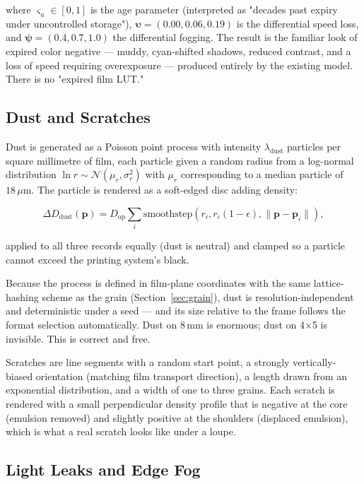 where $\varsigma_a \in [0, 1]$ is the age parameter (interpreted as
"decades past expiry under uncontrolled storage"), $\boldsymbol{\upsilon} =
(0.00, 0.06, 0.19)$ is the differential speed loss, and $\boldsymbol{\psi} =
(0.4, 0.7, 1.0)$ the differential fogging. The result is the familiar look of
expired color negative --- muddy, cyan-shifted shadows, reduced contrast, and a
loss of speed requiring overexposure --- produced entirely by the existing
model. There is no "expired film LUT."

\subsection{Dust and Scratches}

Dust is generated as a Poisson point process with intensity
$\lambda_{\mathrm{dust}}$ particles per square millimetre of film, each particle
given a random radius from a log-normal distribution
$\ln r \sim \mathcal{N}(\mu_r, \sigma_r^2)$ with $\mu_r$ corresponding to a
median particle of $18\,\mu$m. The particle is rendered as a soft-edged disc
adding density:

\begin{equation}
\Delta D_{\mathrm{dust}}(\mathbf{p}) = D_{\mathrm{op}} \sum_i \mathrm{smoothstep}\!\left(r_i, r_i(1-\epsilon), \|\mathbf{p} - \mathbf{p}_i\|\right),
\end{equation}

applied to all three records equally (dust is neutral) and clamped so a particle
cannot exceed the printing system's black.

Because the process is defined in film-plane coordinates with the same
lattice-hashing scheme as the grain (Section~\ref{sec:grain}), dust is
resolution-independent and deterministic under a seed --- and its size relative
to the frame follows the format selection automatically. Dust on 8\,mm is
enormous; dust on 4$\times$5 is invisible. This is correct and free.

Scratches are line segments with a random start point, a strongly
vertically-biased orientation (matching film transport direction), a length drawn
from an exponential distribution, and a width of one to three grains. Each
scratch is rendered with a small perpendicular density profile that is negative
at the core (emulsion removed) and slightly positive at the shoulders (displaced
emulsion), which is what a real scratch looks like under a loupe.

\subsection{Light Leaks and Edge Fog}

